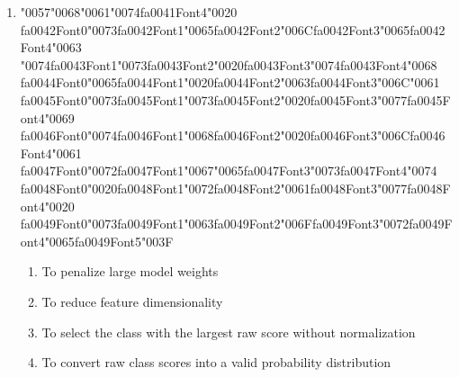 \documentclass[12pt]{article}
\begin{document}
\begin{enumerate}[label=Q\arabic*.]
\item {\char"0057}{\char"0068}{\char"0061}{\char"0074}{\csname fa0041Font4\endcsname\char"0020} {\csname fa0042Font0\endcsname\char"0073}{\csname fa0042Font1\endcsname\char"0065}{\csname fa0042Font2\endcsname\char"006C}{\csname fa0042Font3\endcsname\char"0065}{\csname fa0042Font4\endcsname\char"0063} {\char"0074}{\csname fa0043Font1\endcsname\char"0073}{\csname fa0043Font2\endcsname\char"0020}{\csname fa0043Font3\endcsname\char"0074}{\csname fa0043Font4\endcsname\char"0068} {\csname fa0044Font0\endcsname\char"0065}{\csname fa0044Font1\endcsname\char"0020}{\csname fa0044Font2\endcsname\char"0063}{\csname fa0044Font3\endcsname\char"006C}{\char"0061} {\csname fa0045Font0\endcsname\char"0073}{\csname fa0045Font1\endcsname\char"0073}{\csname fa0045Font2\endcsname\char"0020}{\csname fa0045Font3\endcsname\char"0077}{\csname fa0045Font4\endcsname\char"0069} {\csname fa0046Font0\endcsname\char"0074}{\csname fa0046Font1\endcsname\char"0068}{\csname fa0046Font2\endcsname\char"0020}{\csname fa0046Font3\endcsname\char"006C}{\csname fa0046Font4\endcsname\char"0061} {\csname fa0047Font0\endcsname\char"0072}{\csname fa0047Font1\endcsname\char"0067}{\char"0065}{\csname fa0047Font3\endcsname\char"0073}{\csname fa0047Font4\endcsname\char"0074} {\csname fa0048Font0\endcsname\char"0020}{\csname fa0048Font1\endcsname\char"0072}{\csname fa0048Font2\endcsname\char"0061}{\csname fa0048Font3\endcsname\char"0077}{\csname fa0048Font4\endcsname\char"0020} {\csname fa0049Font0\endcsname\char"0073}{\csname fa0049Font1\endcsname\char"0063}{\csname fa0049Font2\endcsname\char"006F}{\csname fa0049Font3\endcsname\char"0072}{\csname fa0049Font4\endcsname\char"0065}{\csname fa0049Font5\endcsname\char"003F}
\begin{enumerate}[label=(\Alph*)]
    \item To penalize large model weights
    \item To reduce feature dimensionality
    \item To select the class with the largest raw score without normalization
    \item To convert raw class scores into a valid probability distribution
\end{enumerate}

\end{enumerate}
\end{document}
